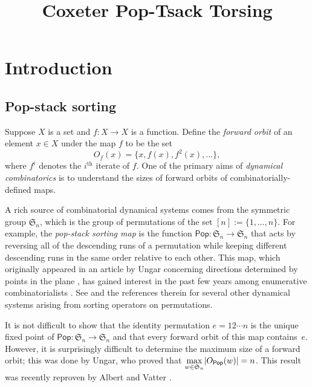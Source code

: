 \documentclass[ALCO,ThmDefs,Unicode,epreuves]{cedram}
\author{\firstname{Colin} \lastname{Defant}}
\author{\firstname{Nathan} \lastname{Williams}}
\title{Coxeter Pop-Tsack Torsing}
\newcommand{\darkblue}{\color{darkblue}}
\newcommand{\defn}[1]{\emph{\darkblue #1}}
\newcommand{\pop}{\mathsf{Pop}}
\DeclarePairedDelimiter\abs{\lvert}{\rvert}
\begin{document}
\maketitle

\section{Introduction}

\subsection{Pop-stack sorting}
Suppose $X$ is a set and $f:X\to X$ is a function. Define the \defn{forward orbit} of an element $x\in X$ under the map $f$ to be the set 
\[
O_f(x)=\{x,f(x),f^2(x),\ldots\},
\]
 where $f^i$ denotes the $i^\text{th}$ iterate of $f$. One of the primary aims of \emph{dynamical combinatorics} is to understand the sizes of forward orbits of combinatorially-defined maps. 


A rich source of combinatorial dynamical systems comes from the symmetric group $\mathfrak S_n$, which is the group of permutations of the set $[n]:=\{1,\ldots,n\}$. For example, the \defn{pop-stack sorting map} is the function $\pop:\mathfrak S_n\to \mathfrak S_n$ that acts by reversing all of the descending runs of a permutation while keeping different descending runs in the same order relative to each other. This map, which originally appeared in an article by Ungar concerning directions determined by points in the plane \cite{Ungar}, has gained interest in the past few years among enumerative combinatorialists \cite{AlbertVatter, Asinowski, Asinowski2, Elder, ClaessonPop, ClaessonPop2, Pudwell}. See \cite{defant2021stack} and the references therein for several other dynamical systems arising from sorting operators on permutations. 

It is not difficult to show that the identity permutation $e=12\cdots n$ is the unique fixed point of $\pop:\mathfrak S_n\to \mathfrak S_n$ and that every forward orbit of this map contains~$e$. However, it is surprisingly difficult to determine the maximum size of a forward orbit; this was done by Ungar, who proved that $\max\limits_{w\in \mathfrak S_n}\abs{O_\pop(w)}=n$. This result was recently reproven by Albert and Vatter \cite{AlbertVatter}. 
\end{document}
